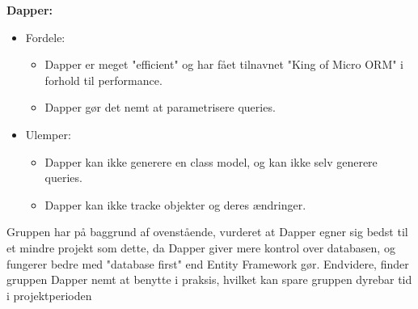 \textbf{Dapper:}
\begin{itemize}
    \item Fordele:
    \begin{itemize}
        \item Dapper er meget "efficient" og har fået tilnavnet "King of Micro ORM" i forhold til performance.
        \item Dapper gør det nemt at parametrisere queries.
    \end{itemize}
    \item Ulemper:
    \begin{itemize}
        \item Dapper kan ikke generere en class model, og kan ikke selv generere queries.
        \item Dapper kan ikke tracke objekter og deres ændringer.
    \end{itemize}
\end{itemize}

Gruppen har på baggrund af ovenstående, vurderet at Dapper egner sig bedst til et mindre projekt som
dette, da Dapper giver mere kontrol over databasen, og fungerer bedre med "database first" end
Entity Framework gør. Endvidere, finder gruppen Dapper nemt at benytte i praksis, hvilket kan spare gruppen dyrebar
tid i projektperioden